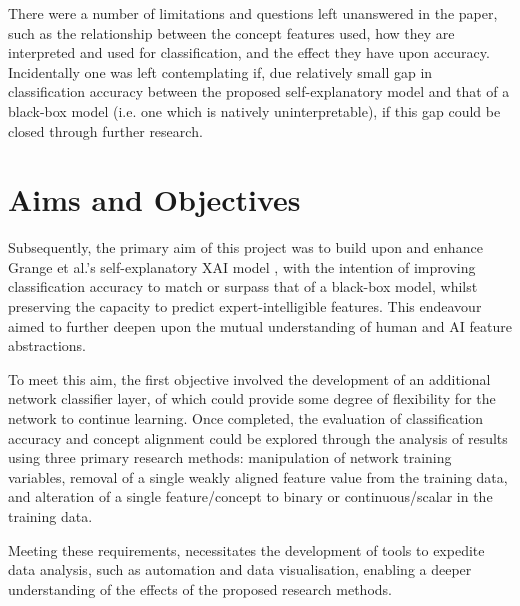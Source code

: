 There were a number of limitations and questions left unanswered in the paper, such as the relationship between the concept features used, how they are interpreted and used for classification, and the effect they have upon accuracy. Incidentally one was left contemplating if, due relatively small gap in classification accuracy between the proposed self-explanatory model and that of a black-box model (i.e. one which is natively uninterpretable), if this gap could be closed through further research.


\section{Aims and Objectives}

Subsequently, the primary aim of this project was to build upon and enhance Grange et al.'s self-explanatory XAI model \cite{grangeXAISelfexplanatoryAI2022}, with the intention of improving classification accuracy to match or surpass that of a black-box model, whilst preserving the capacity to predict expert-intelligible features. This endeavour aimed to  further deepen upon the mutual understanding of human and AI feature abstractions.

To meet this aim, the first objective involved the development of an additional network classifier layer, of which could provide some degree of flexibility for the network to continue learning. Once completed, the evaluation of classification accuracy and concept alignment could be explored through the analysis of results using three primary research methods: manipulation of network training variables, removal of a single weakly aligned feature value from the training data, and alteration of a single feature/concept to binary or continuous/scalar in the training data.

Meeting these requirements, necessitates the development of tools to expedite data analysis, such as automation and data visualisation, enabling a deeper understanding of the effects of the proposed research methods.